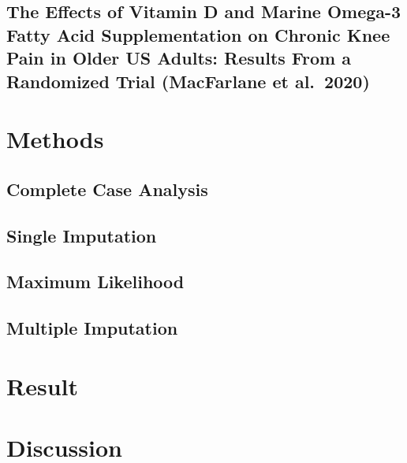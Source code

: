 \documentclass{article}
\begin{document}
\subsection{The Effects of Vitamin D and Marine Omega-3 Fatty Acid
Supplementation on Chronic Knee Pain in Older US Adults: Results From a
Randomized Trial (MacFarlane et
al.~2020)}\label{the-effects-of-vitamin-d-and-marine-omega-3-fatty-acid-supplementation-on-chronic-knee-pain-in-older-us-adults-results-from-a-randomized-trial-macfarlane-et-al.-2020}

\section{Methods}\label{methods}

\subsection{Complete Case Analysis}\label{complete-case-analysis}

\subsection{Single Imputation}\label{single-imputation}

\subsection{Maximum Likelihood}\label{maximum-likelihood}

\subsection{Multiple Imputation}\label{multiple-imputation}

\section{Result}\label{result}

\section{Discussion}\label{discussion}



\end{document}
